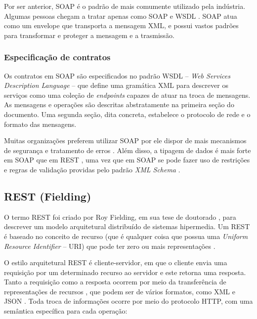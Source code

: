 Por ser anterior, SOAP é o padrão de \ws{} mais comumente utilizado pela
indústria.
Algumas pessoas chegam a tratar \ws{} apenas como SOAP e WSDL
\cite{serrano2014service}. SOAP atua como um envelope que transporta a mensagem
XML, e possui vastos padrões para transformar e proteger a mensagem e a
trasmissão. 


\subsubsection{Especificação de contratos}
\vspace{-6mm}

Os contratos em SOAP são especificados no padrão WSDL -- \textit{Web Services
Description Language} -- que define uma gramática XML para descrever os serviços
como uma coleção de \textit{endpoints} capazes de atuar na troca de mensagens.
As mensagens e operações são descritas abstratamente na primeira seção do
documento. Uma segunda seção, dita concreta, estabelece o protocolo de rede e o
formato das mensagens.

Muitas organizações preferem utilizar SOAP por ele dispor de mais mecanismos de
segurança e tratamento de erros \cite{serrano2014service}. Além disso, a tipagem
de dados é mais forte em SOAP que em REST \cite{mumbaikar2013web}, uma vez que
em SOAP se pode fazer uso de restrições e regras de validação providas pelo
padrão \textit{XML Schema} \cite{XMLSchema}.


\subsection{REST (Fielding)}
\label{secaoREST}
\vspace{-6mm}

O termo REST foi criado por Roy Fielding, em sua tese de doutorado
\cite{fielding2000architectural}, para descrever um modelo arquitetural
distribuído de sistemas hipermedia. Um \ws{} REST é baseado no conceito de
recurso (que é qualquer coisa que possua uma \textit{Uniform Resource
Identifier} -- URI) que pode ter zero ou mais representações
\cite{he2003service}.

O estilo arquitetural REST é cliente-servidor, em que o cliente envia uma
requisição por um determinado recurso ao servidor e este retorna uma resposta.
Tanto a requisição como a resposta ocorrem por meio da transferência de
representações de recursos \cite{mumbaikar2013web}, que podem ser de vários
formatos, como XML e JSON \cite{serrano2014service}. Toda troca de informações
ocorre por meio do protocolo HTTP, com uma semântica específica para cada
operação:

